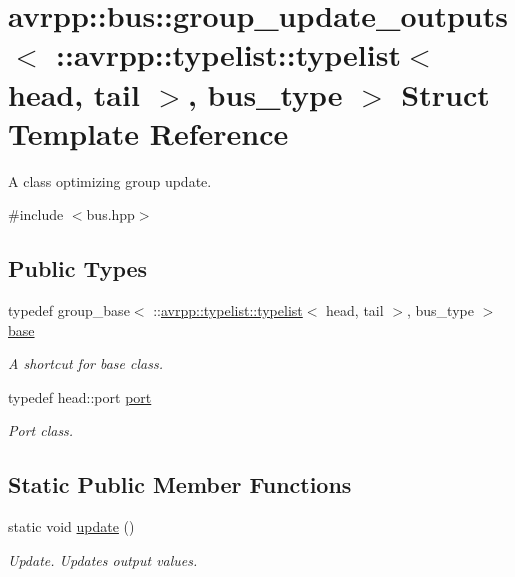 \hypertarget{structavrpp_1_1bus_1_1group__update__outputs_3_01_1_1avrpp_1_1typelist_1_1typelist_3_01head_00_01tail_01_4_00_01bus__type_01_4}{
\section{avrpp::bus::group\_\-update\_\-outputs$<$ ::avrpp::typelist::typelist$<$ head, tail $>$, bus\_\-type $>$ Struct Template Reference}
\label{structavrpp_1_1bus_1_1group__update__outputs_3_01_1_1avrpp_1_1typelist_1_1typelist_3_01head_00_01tail_01_4_00_01bus__type_01_4}
}


A class optimizing group update.  




{\ttfamily \#include $<$bus.hpp$>$}

\subsection*{Public Types}
\begin{DoxyCompactItemize}
\item 
typedef group\_\-base$<$ ::\hyperlink{structavrpp_1_1typelist_1_1typelist}{avrpp::typelist::typelist}$<$ head, tail $>$, bus\_\-type $>$ \hyperlink{structavrpp_1_1bus_1_1group__update__outputs_3_01_1_1avrpp_1_1typelist_1_1typelist_3_01head_00_01tail_01_4_00_01bus__type_01_4_a2e4c9b090dc3b40c81ec396316d7553e}{base}
\begin{DoxyCompactList}\small\item\em A shortcut for base class. \item\end{DoxyCompactList}\item 
typedef head::port \hyperlink{structavrpp_1_1bus_1_1group__update__outputs_3_01_1_1avrpp_1_1typelist_1_1typelist_3_01head_00_01tail_01_4_00_01bus__type_01_4_a06a541f6afb668eea4b1bb0b1f12ee7b}{port}
\begin{DoxyCompactList}\small\item\em Port class. \item\end{DoxyCompactList}\end{DoxyCompactItemize}
\subsection*{Static Public Member Functions}
\begin{DoxyCompactItemize}
\item 
static void \hyperlink{structavrpp_1_1bus_1_1group__update__outputs_3_01_1_1avrpp_1_1typelist_1_1typelist_3_01head_00_01tail_01_4_00_01bus__type_01_4_a79bc23946ab60bcf67f7c0e83db2547a}{update} ()
\begin{DoxyCompactList}\small\item\em Update. Updates output values. \item\end{DoxyCompactList}\end{DoxyCompactItemize}


